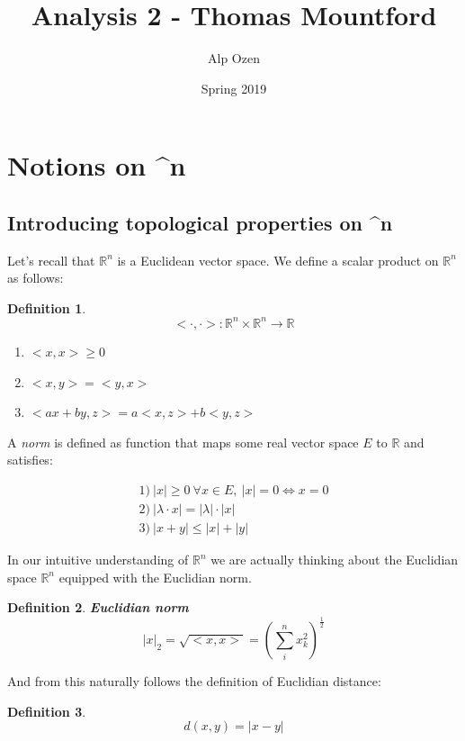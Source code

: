 \documentclass[titlepage]{article}
\title{\textbf{Analysis 2 - Thomas Mountford}}
\author{Alp Ozen}
\date{Spring 2019}
\newtheorem{definition}{Definition}
\newcommand{\Rn}{\mathbb{R}^n}
\begin{document}
\maketitle
\tableofcontents
\clearpage


\section{Notions on \Rn}

\subsection{Introducing topological properties on \Rn}
Let's recall that $\Rn$ is a Euclidean vector space. We define a scalar product on $\Rn$ as follows:

\begin{definition}
\begin{equation*}
    < \cdot, \cdot > : \Rn \times \Rn \to \mathbb{R}
\end{equation*}


\begin{enumerate}
    \item $<x,x> \geq 0$
    \item $<x,y> = <y,x>$
    \item $<ax + by, z> = a<x,z> + b<y,z>$
\end{enumerate}

\end{definition}


A \textit{norm} is defined as function that maps some real vector space $E$ to $\mathbb{R}$ and satisfies:

\begin{align*}
    1) \ |x| \geq 0 \ \forall x \in E, \ |x| = 0 \iff x = 0\\
    2) \ |\lambda \cdot x| = |\lambda| \cdot |x| \\
    3) \ |x+y| \leq |x| + |y|
\end{align*}

In our intuitive understanding of $\Rn$ we are actually thinking about the Euclidian space $\Rn$ equipped with the Euclidian norm.

\begin{definition}\textbf{Euclidian norm}
$$|x|_{2} = \sqrt{<x,x>} = (\sum^{n}_{i}x^{2}_{k} )^{\frac{1}{2}} $$
\end{definition}

And from this naturally follows the definition of Euclidian distance:
\begin{definition}
$$d(x,y) = |x-y|$$
\end{definition}
\end{document}
